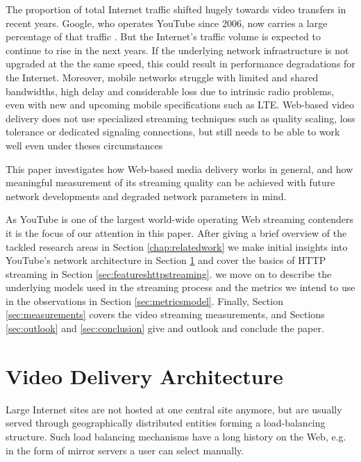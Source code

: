 The proportion of total Internet traffic shifted hugely towards video transfers in recent years. Google, who operates YouTube since 2006, now carries a large percentage of that traffic \cite{nw2010carrier}. But the Internet's traffic volume is expected to continue to rise in the next years. If the underlying network infrastructure is not upgraded at the the same speed, this could result in performance degradations for the Internet. Moreover, mobile networks struggle with limited and shared bandwidths, high delay and considerable loss due to intrinsic radio problems, even with new and upcoming mobile specifications such as LTE. Web-based video delivery does not use specialized streaming techniques such as quality scaling, loss tolerance or dedicated signaling connections, but still needs to be able to work well even under theses circumstances



This paper investigates how Web-based media delivery works in general, and how meaningful measurement of its streaming quality can be achieved with future network developments and degraded network parameters in mind.

As YouTube is one of the largest world-wide operating Web streaming contenders it is the focus of our attention in this paper. After giving a brief overview of the tackled research areas in Section \ref{chap:relatedwork} we make initial insights into YouTube's network architecture in Section \ref{sec:videodeliveryarchitecture} and cover the basics of HTTP streaming in Section \ref{sec:featureshttpstreaming}. we move on to describe the underlying models used in the streaming process and the metrics we intend to use in the observations in Section \ref{sec:metricsmodel}. Finally, Section \ref{sec:measurements} covers the video streaming measurements, and Sections \ref{sec:outlook} and \ref{sec:conclusion} give and outlook and conclude the paper.






\section{Video Delivery Architecture}
\label{sec:videodeliveryarchitecture}


Large Internet sites are not hosted at one central site anymore, but are usually served through geographically distributed entities forming a load-balancing structure. Such load balancing mechanisms have a long history on the Web, e.g. in the form of mirror servers a user can select manually.

